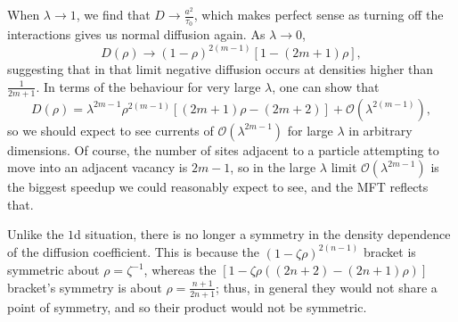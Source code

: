When $\lambda \rightarrow 1$, we find that $D \rightarrow \frac{a^2}{\tau_0}$, which makes perfect sense as turning off the interactions gives us normal diffusion again. As $\lambda \rightarrow 0$,
\begin{equation}
 D(\rho) \rightarrow (1-\rho)^{2(m-1)} \left[ 1 - (2m+1)\rho \right],
\end{equation}
suggesting that in that limit negative diffusion occurs at densities higher than $\frac{1}{2m+1}$.
In terms of the behaviour for very large $\lambda$, one can show that
\begin{equation}
 D(\rho) = \lambda^{2m-1} \rho^{2(m-1)} \left[ (2m+1)\rho - (2m+2) \right] + \mathcal{O}(\lambda^{2(m-1)}),
\end{equation}
so we should expect to see currents of $\mathcal{O}(\lambda^{2m-1})$ for large $\lambda$ in arbitrary
dimensions. Of course, the number of sites adjacent to a particle attempting to move into an adjacent vacancy
is $2m-1$, so in the large $\lambda$ limit $\mathcal{O}(\lambda^{2m-1})$ is the biggest speedup
we could reasonably expect to see, and the MFT reflects that.

Unlike the $1$d situation, there is no longer a symmetry in the density dependence of the
diffusion coefficient. This is because the $\left( 1 - \zeta \rho \right)^{2(n-1)}$ bracket is
symmetric about $\rho=\zeta^{-1}$, whereas the $\left[ 1 - \zeta \rho\left( (2n+2) - (2n+1)\rho \right) \right] $ bracket's symmetry is about $\rho=\frac{n+1}{2n+1}$; thus, in general they would not share
a point of symmetry, and so their product would not be symmetric.

